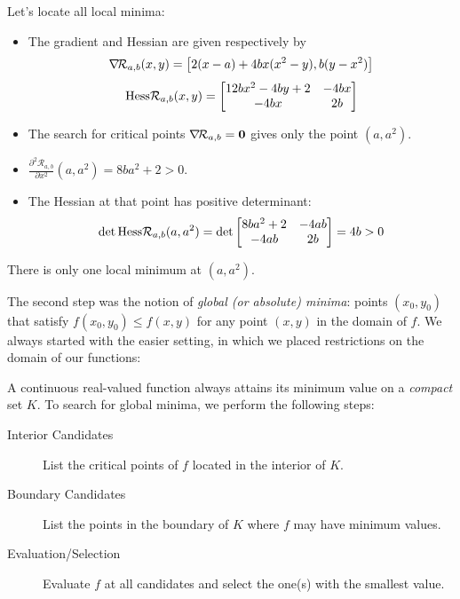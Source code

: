 \begin{example}
Let's locate all local minima:
\begin{itemize}
	\item The gradient and Hessian are given respectively by
	\begin{equation*}
	\mathop{\nabla\! {\mathcal{R}_{a,b}}}(x,y) = \big[ 2(x-a) +4bx(x^2-y) , b(y-x^2) \big] \\
	\end{equation*}
	\begin{equation*}
	\mathop{\mathrm{Hess}{\mathcal{R}_{a,b}}}(x,y) = \begin{bmatrix}
	12bx^2-4by+2 & -4bx \\
	-4bx & 2b
	\end{bmatrix}
	\end{equation*}
	\item The search for critical points $\mathop{\nabla\! {\mathcal{R}_{a,b}}} = \boldsymbol{0}$ gives only the point $(a,a^2)$.
	\item $\frac{\partial^2 \mathcal{R}_{a,b}}{\partial x^2}(a,a^2) = 8ba^2+2 > 0$.
	\item The Hessian at that point has positive determinant:
	\begin{equation*}
	\det \mathop{\mathrm{Hess}{\mathcal{R}_{a,b}}}(a,a^2) = \det \begin{bmatrix}
	8ba^2+2 & -4ab \\
	-4ab & 2b
	\end{bmatrix} = 4b > 0
	\end{equation*}
\end{itemize}
There is only one local minimum at $(a,a^2)$.
\end{example}

The second step was the notion of \emph{global (or absolute) minima}: points $(x_0,y_0)$ that satisfy $f(x_0,y_0) \leq f(x,y)$ for any point $(x,y)$ in the domain of $f$.  We always started with the easier setting, in which we placed restrictions on the domain of our functions:

\begin{theorem}\label{theorem:MaxMinCompact}
A continuous real-valued function always attains its minimum value on a \emph{compact} set $K$. To search for global minima, we perform the following steps:
\begin{description}
	\item[Interior Candidates] List the critical points of $f$ located in the interior of $K$.
	\item[Boundary Candidates] List the points in the boundary of $K$ where $f$ may have minimum values.
	\item [Evaluation/Selection] Evaluate $f$ at all candidates and select the one(s) with the smallest value.
\end{description}
\end{theorem}

